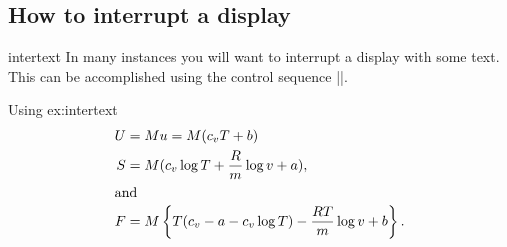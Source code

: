 {{{%
%
%
 




\subsection{How to interrupt a display}

\begin{docCommand}{intertext}{}
 In many instances you will want to interrupt a display with some text. This can be accomplished using the control sequence |\intertext|.
 \end{docCommand}
 
 

\begin{texexample}{Using }{ex:intertext}
\begin{gather}
\begin{aligned}
U &= M u = M(c_v T + b)\\
S &= M(c_v  \log T + \frac{R}{m}  \log v + a),\\
\intertext{and } 
F &= M \left\{T(c_v - a - c_v \log T) - \frac{RT}{m} \log v + b \right\}.
\end{aligned}
\end{gather}
\end{texexample}

}}}
